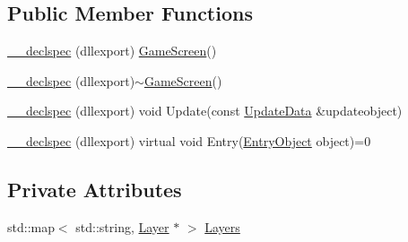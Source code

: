 \subsection*{Public Member Functions}
\begin{DoxyCompactItemize}
\item 
\hyperlink{class_game_screen_a41fb99405265eadec9712c99673a05f1}{\-\_\-\-\_\-declspec} (dllexport) \hyperlink{class_game_screen}{Game\-Screen}()
\item 
\hyperlink{class_game_screen_a940d1b9790ff4b737ee4c521d10a5e08}{\-\_\-\-\_\-declspec} (dllexport)$\sim$\hyperlink{class_game_screen}{Game\-Screen}()
\item 
\hyperlink{class_game_screen_a902bce77e2df723b9547d6364b5aaadf}{\-\_\-\-\_\-declspec} (dllexport) void Update(const \hyperlink{class_update_data}{Update\-Data} \&updateobject)
\item 
\hyperlink{class_game_screen_a03f75f898e71457324bd5f2cea6fc8a2}{\-\_\-\-\_\-declspec} (dllexport) virtual void Entry(\hyperlink{class_entry_object}{Entry\-Object} object)=0
\end{DoxyCompactItemize}
\subsection*{Private Attributes}
\begin{DoxyCompactItemize}
\item 
std\-::map$<$ std\-::string, \hyperlink{class_layer}{Layer} $\ast$ $>$ \hyperlink{class_game_screen_ab134d175092c247558838f11d66e9493}{Layers}
\end{DoxyCompactItemize}


